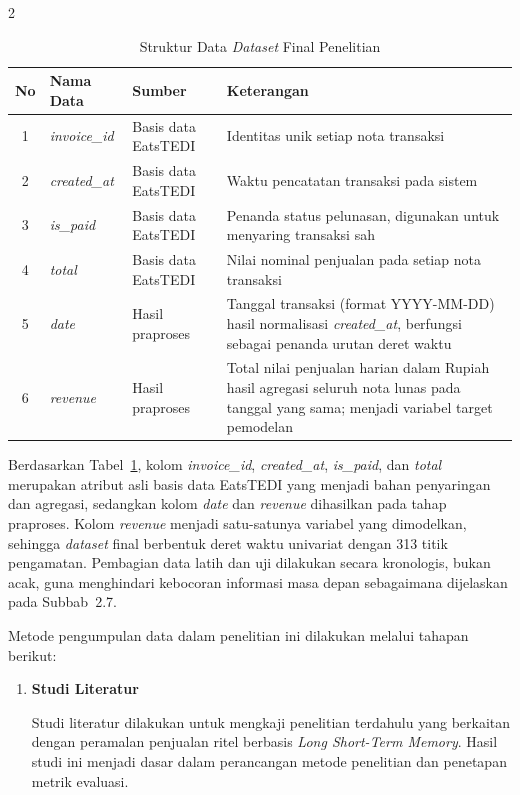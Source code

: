 \documentclass[12pt, a4paper, onecolumn, oneside]{report}
\begin{document}
\begin{spacing}{2}
\begin{table}[H]
\centering
\caption{Struktur Data \textit{Dataset} Final Penelitian}
\label{tab:struktur_data}
\begin{tabularx}{\textwidth}{|c|l|p{3.0cm}|X|}
\hline
\textbf{No} & \textbf{Nama Data} & \textbf{Sumber} & \textbf{Keterangan} \\ \hline
1 & \textit{invoice\_id} & Basis data EatsTEDI & Identitas unik setiap nota transaksi \\ \hline
2 & \textit{created\_at} & Basis data EatsTEDI & Waktu pencatatan transaksi pada sistem \\ \hline
3 & \textit{is\_paid} & Basis data EatsTEDI & Penanda status pelunasan, digunakan untuk menyaring transaksi sah \\ \hline
4 & \textit{total} & Basis data EatsTEDI & Nilai nominal penjualan pada setiap nota transaksi \\ \hline
5 & \textit{date} & Hasil praproses & Tanggal transaksi (format YYYY-MM-DD) hasil normalisasi \textit{created\_at}, berfungsi sebagai penanda urutan deret waktu \\ \hline
6 & \textit{revenue} & Hasil praproses & Total nilai penjualan harian dalam Rupiah hasil agregasi seluruh nota lunas pada tanggal yang sama; menjadi variabel target pemodelan \\ \hline
\end{tabularx}
\end{table}

Berdasarkan Tabel~\ref{tab:struktur_data}, kolom \textit{invoice\_id}, \textit{created\_at}, \textit{is\_paid}, dan \textit{total} merupakan atribut asli basis data EatsTEDI yang menjadi bahan penyaringan dan agregasi, sedangkan kolom \textit{date} dan \textit{revenue} dihasilkan pada tahap praproses. Kolom \textit{revenue} menjadi satu-satunya variabel yang dimodelkan, sehingga \textit{dataset} final berbentuk deret waktu univariat dengan 313 titik pengamatan. Pembagian data latih dan uji dilakukan secara kronologis, bukan acak, guna menghindari kebocoran informasi masa depan sebagaimana dijelaskan pada Subbab~2.7.

Metode pengumpulan data dalam penelitian ini dilakukan melalui tahapan berikut:
\begin{enumerate}[label=\alph*.]
    \item \textbf{Studi Literatur}

    Studi literatur dilakukan untuk mengkaji penelitian terdahulu yang berkaitan dengan peramalan penjualan ritel berbasis \textit{Long Short-Term Memory}. Hasil studi ini menjadi dasar dalam perancangan metode penelitian dan penetapan metrik evaluasi.


\end{enumerate}
\end{spacing}
\end{document}
